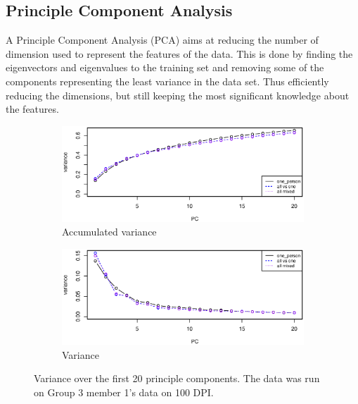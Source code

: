 \subsection{Principle Component Analysis}
A Principle Component Analysis (PCA) aims at reducing the number of dimension used to represent the features of the data.
This is done by finding the eigenvectors and eigenvalues to the training set and removing some of the components representing the least variance in the data set.
Thus efficiently reducing the dimensions, but still keeping the most significant knowledge about the features.

\begin{figure}[h]
\begin{subfigure}{0.49\textwidth}
\centering
\includegraphics[width=\textwidth]{graphics/pca_acc_variance}
\caption{Accumulated variance}
\label{fig:pca_accumulated_var}
%
\end{subfigure}
\begin{subfigure}{0.49\textwidth}
\centering
\includegraphics[width=\textwidth]{graphics/pca_variance}
\caption{Variance}
\label{fig:pca_accumulated_var}
\end{subfigure}
\caption[PCA variance]{Variance over the first 20 principle components.
The data was run on Group 3 member 1's data on 100 DPI. }
\label{fig:variance}
\end{figure}

